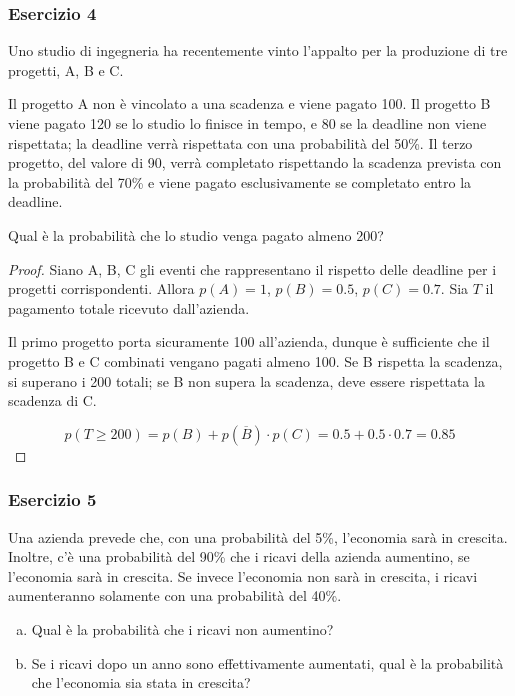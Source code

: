 \documentclass{beamer}
\begin{document}
\begin{frame}[fragile]
	\frametitle{Esercizio 4}

	\begin{exercise}
		Uno studio di ingegneria ha recentemente vinto l'appalto per la produzione di tre progetti, A, B e C.

		\medskip

		Il progetto A non è vincolato a una scadenza e viene pagato 100. Il progetto B viene pagato 120 se lo studio lo finisce in tempo, e 80 se la deadline non viene rispettata; la deadline verrà rispettata con una probabilità del 50\%. Il terzo progetto, del valore di 90, verrà completato rispettando la scadenza prevista con la probabilità del 70\% e viene pagato esclusivamente se completato entro la deadline.

		\medskip

		Qual è la probabilità che lo studio venga pagato almeno 200?
	\end{exercise}
\end{frame}

\begin{frame}[fragile]
	\begin{proof}%
		Siano A, B, C gli eventi che rappresentano il rispetto delle deadline per i progetti corrispondenti. Allora $p(A)=1$, $p(B)=0.5$, $p(C)=0.7$. Sia $T$ il pagamento totale ricevuto dall'azienda.

		\medskip

		Il primo progetto porta sicuramente 100 all'azienda, dunque è sufficiente che il progetto B e C combinati vengano pagati almeno 100. Se B rispetta la scadenza, si superano i 200 totali; se B non supera la scadenza, deve essere rispettata la scadenza di C.

		$$p(T\geq200)=p(B)+p(\overline{B})\cdot p(C)=0.5+0.5\cdot0.7=0.85$$
	\end{proof}
\end{frame}
\begin{frame}[fragile]
	\frametitle{Esercizio 5}

	\begin{exercise}
		Una azienda prevede che, con una probabilità del 5\%, l'economia sarà in crescita. Inoltre, c'è una probabilità del 90\% che i ricavi della azienda aumentino, se l'economia sarà in crescita. Se invece l'economia non sarà in crescita, i ricavi aumenteranno solamente con una probabilità del 40\%.

		\begin{enumerate}[(a)]
			\item Qual è la probabilità che i ricavi non aumentino?
			\item Se i ricavi dopo un anno sono effettivamente aumentati, qual è la probabilità che l'economia sia stata in crescita?
		\end{enumerate}
	\end{exercise}
\end{frame}
\end{document}

